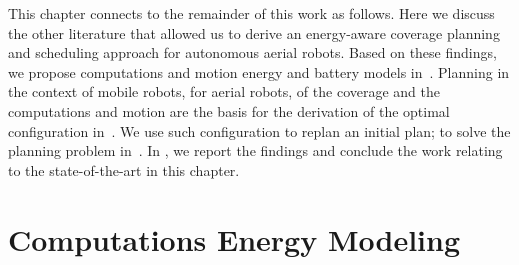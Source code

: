This chapter connects to the remainder of this work as follows. Here we discuss the other literature that allowed us to derive an energy-aware coverage planning and scheduling approach for autonomous aerial robots. Based on these findings, we propose computations and motion energy and battery models in~. Planning in the context of mobile robots, for aerial robots, of the coverage and the computations and motion are the basis for the derivation of the optimal configuration in~. We use such configuration to replan an initial plan; to solve the planning problem in~. In , we report the findings and conclude the work relating to the state-of-the-art in this chapter.


\section{Computations Energy Modeling}
\label{sec:soa-ene-mod}


